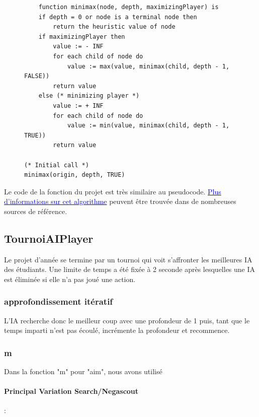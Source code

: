 \documentclass[utf8]{article}
\begin{document}
\begin{figure}[H]
\begin{minipage}{\textwidth}
  \centering
	\begin{lstlisting}
	function minimax(node, depth, maximizingPlayer) is
    if depth = 0 or node is a terminal node then
        return the heuristic value of node
    if maximizingPlayer then
        value := - INF
        for each child of node do
            value := max(value, minimax(child, depth - 1, FALSE))
        return value
    else (* minimizing player *)
        value := + INF
        for each child of node do
            value := min(value, minimax(child, depth - 1, TRUE))
        return value

(* Initial call *)
minimax(origin, depth, TRUE)
    \end{lstlisting}
  \label{fig:code_exemple}
\end{minipage}
\end{figure}

Le code de la fonction du projet est très similaire au pseudocode.
\href{https://en.wikipedia.org/wiki/Minimax}{\textcolor{blue}{Plus d'informations sur cet algorithme}} peuvent être trouvée dans de nombreuses sources de référence.

\newpage

\subsection{TournoiAIPlayer}
Le projet d'année se termine par un tournoi qui voit s'affronter les meilleures IA des étudiants. Une limite de temps a été fixée à 2 seconde après lesquelles une IA est éliminée si elle n'a pas joué une action.

\subsubsection{approfondissement itératif}
L'IA recherche donc le meilleur coup avec une profondeur de 1 puis, tant que le temps imparti n'est pas écoulé, incrémente la profondeur et recommence.

\subsubsection{m}
Dans la fonction "m" pour "aim", nous avons utilisé

\paragraph{Principal Variation Search/Negascout}:
\end{document}
